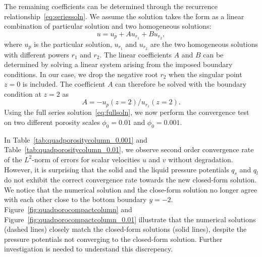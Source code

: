The remaining coefficients can be determined through the recurrence 
relationship~\eqref{eq:seriessoln}.
We assume the solution takes the form as a linear combination of particular solution and two 
homogeneous solutions:
\begin{equation}\label{eq:fullsoln}
		  u = u_p + A u_{r_1} + B u_{r_2},
\end{equation}
where $u_p$ is the particular solution, $u_{r_1}$ and $u_{r_2}$ are the two 
homogeneous solutions with different powers $r_1$ and $r_2$. 
The linear coefficients $A$ and $B$ can be determined
by solving a linear system arising from the imposed boundary conditions.
In our case, we drop the negative root $r_2$ when the singular point $z=0$ 
is included. The coefficient $A$ can therefore be solved with the boundary condition 
at $z=2$ as
\begin{equation}
		  A = -u_p(z=2)/u_{r_1}(z=2).
\end{equation}
Using the full series solution~\eqref{eq:fullsoln}, we now perform the convergence test 
on two different porosity scales $\phi_0 = 0.01$ and
$\phi_0 = 0.001$.

In Table~\ref{tab:quadporositycolumn_0.001} and 
Table~\ref{tab:quadporositycolumn_0.01}, we observe second order convergence
rate of the $L^2$-norm of errors for scalar velocities $u$ and $v$ without degradation. However, it is 
surprising that the solid and the liquid pressure potentials $q_s$ and $q_l$
do not exhibit the correct convergence rate towards the new closed-form 
solution.
We notice that the numerical solution and the close-form solution no longer agree with each other close to 
the bottom boundary $y=-2$.
Figure~\ref{fig:quadporocompactcolumn} and 
Figure~\ref{fig:quadporocompactcolumn_0.01} illustrate that the numerical solutions (dashed lines) 
closely match the closed-form solutions (solid lines), despite the pressure potentials not converging to the closed-form solution. Further investigation is needed
to understand this discrepency.

